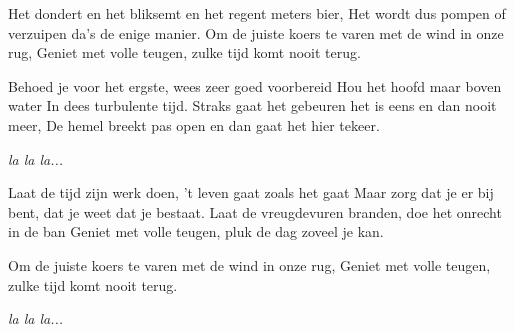 \begin{chorus}
Het dondert en het bliksemt en het regent meters bier,
Het wordt dus pompen of verzuipen da's de enige manier.
Om de juiste koers te varen met de wind in onze rug,
Geniet met volle teugen, zulke tijd komt nooit terug.
\end{chorus}

\begin{verse*}
Behoed je voor het ergste, wees zeer goed voorbereid
Hou het hoofd maar boven water
In dees turbulente tijd.
Straks gaat het gebeuren het is eens en dan nooit meer,
De hemel breekt pas open en dan gaat het hier tekeer.
\end{verse*}

\thechorus

\begin{verse*}
\textit{la la la...}
\end{verse*}

\begin{verse*}
Laat de tijd zijn werk doen, 't leven gaat zoals het gaat
Maar zorg dat je er bij bent, dat je weet dat je bestaat.
Laat de vreugdevuren branden, doe het onrecht in de ban
Geniet met volle teugen, pluk de dag zoveel je kan.
\end{verse*}

\thechorus

\begin{verse*}
Om de juiste koers te varen met de wind in onze rug,
Geniet met volle teugen, zulke tijd komt nooit terug.
\end{verse*}

\begin{verse*}
\textit{la la la...} 
\end{verse*}
